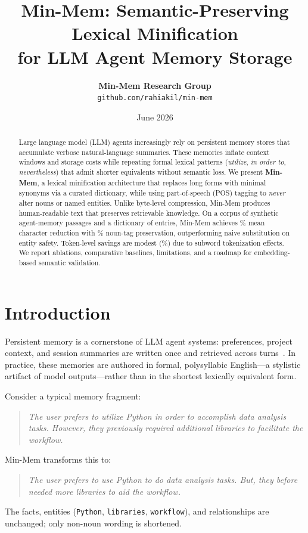 \documentclass[10pt,twocolumn]{article}
\title{\textbf{Min-Mem: Semantic-Preserving Lexical Minification\\for LLM Agent Memory Storage}}
\author{
    \textbf{Min-Mem Research Group}\\
    \texttt{github.com/rahiakil/min-mem}
}
\date{June 2026}
\begin{document}
\maketitle

\begin{abstract}
Large language model (LLM) agents increasingly rely on persistent memory stores that accumulate verbose natural-language summaries. These memories inflate context windows and storage costs while repeating formal lexical patterns (\emph{utilize}, \emph{in order to}, \emph{nevertheless}) that admit shorter equivalents without semantic loss. We present \textbf{Min-Mem}, a lexical minification architecture that replaces long forms with minimal synonyms via a curated dictionary, while using part-of-speech (POS) tagging to \emph{never} alter nouns or named entities. Unlike byte-level compression, Min-Mem produces human-readable text that preserves retrievable knowledge. On a corpus of \CorpusSize{} synthetic agent-memory passages and a dictionary of \DictSize{} entries, Min-Mem achieves \MinMemCharSavings\% mean character reduction with \MinMemNounPres\% noun-tag preservation, outperforming naive substitution on entity safety. Token-level savings are modest (\MinMemTokenSavings\%) due to subword tokenization effects. We report ablations, comparative baselines, limitations, and a roadmap for embedding-based semantic validation.
\end{abstract}

\section{Introduction}

Persistent memory is a cornerstone of LLM agent systems: preferences, project context, and session summaries are written once and retrieved across turns~\cite{memgpt,generative_agents}. In practice, these memories are authored in formal, polysyllabic English---a stylistic artifact of model outputs---rather than in the shortest lexically equivalent form.

Consider a typical memory fragment:
\begin{quote}\small
\emph{The user prefers to utilize Python in order to accomplish data analysis tasks. However, they previously required additional libraries to facilitate the workflow.}
\end{quote}
Min-Mem transforms this to:
\begin{quote}\small
\emph{The user prefers to use Python to do data analysis tasks. But, they before needed more libraries to aid the workflow.}
\end{quote}
The facts, entities (\texttt{Python}, \texttt{libraries}, \texttt{workflow}), and relationships are unchanged; only non-noun wording is shortened.
\end{document}

